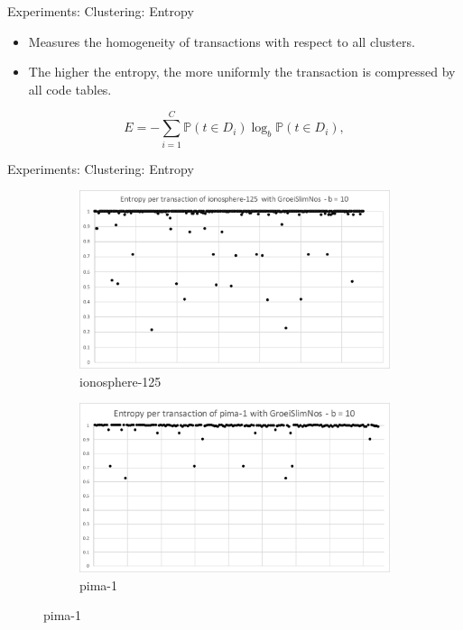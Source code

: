 \documentclass{beamer}
\newcommand{\prob}{\mathbb{P}}
\begin{document}
\begin{frame}{Experiments: Clustering: Entropy}
	\begin{itemize}
		\item Measures the homogeneity of transactions with respect to all clusters.
		\item The higher the entropy, the more uniformly the transaction is compressed by all code tables.
	\end{itemize}
\[E = -\sum\limits_{i=1}^{C} \prob(t \in D_i)\log_{b}\prob(t \in D_i),\]
\end{frame}

\begin{frame}{Experiments: Clustering: Entropy}
\begin{figure}[H]
  \centering
  \begin{subfigure}[b]{0.6\textwidth}
    \includegraphics[width=\textwidth]{img/ent-iono-125}
    \caption{ionosphere-125}
  \end{subfigure}

  \begin{subfigure}[b]{0.6\textwidth}
    \includegraphics[width=\textwidth]{img/ent-pima-1}
    \caption{pima-1}
  \end{subfigure}
\end{figure}
\end{frame}
\end{document}
